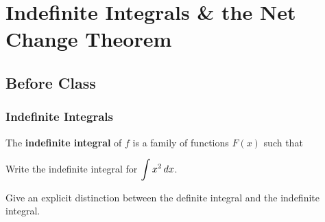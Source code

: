 \documentclass[notes]{subfiles}
\begin{document}
	\fancyhead[LO,RE]{\bfseries \currentname}
	\fancyfoot[C]{{}}
	\fancyfoot[RO,LE]{\large \thepage}	%
	
\section*{Indefinite Integrals \& the Net Change Theorem}\label{cs44}
	\subsection*{Before Class}
	\subsubsection*{Indefinite Integrals}
		\begin{defn}
			The \textbf{indefinite integral} of $f$ is a family of functions $F(x)$ such that
		\end{defn}

		\begin{ex}
			Write the indefinite integral for $\displaystyle \int x^2\,dx$.  
		\end{ex}
			
		\begin{question}
			Give an explicit distinction between the definite integral and the indefinite integral.
		\end{question}	
		
\end{document}

